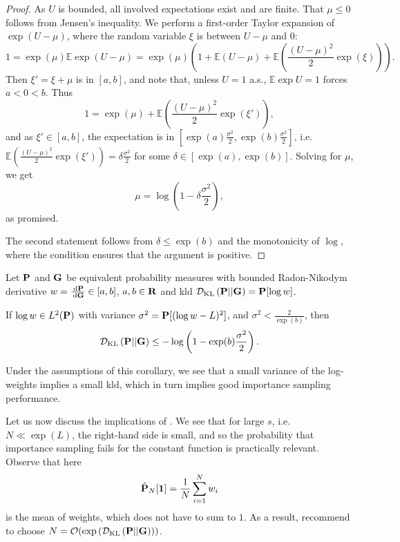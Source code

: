 \begin{proof}
    As $U$ is bounded, all involved expectations exist and are finite. That $\mu \leq 0$ follows from Jensen's inequality. We perform a first-order Taylor expansion of $\exp(U - \mu)$, where the random variable $\xi$ is between $U - \mu$ and $0$:
    $$
    1 = \exp(\mu)\mathbb E \exp (U - \mu) = \exp (\mu) \left( 1 + \mathbb E (U - \mu) + \mathbb E\left(\frac{(U-\mu)^{2}}{2} \exp(\xi)\right) \right).
    $$
    Then $\xi' = \xi + \mu$ is in $[a,b]$, and note that, unless $U = 1$ a.s., $\mathbb E \exp U = 1$ forces $a < 0 < b$. 
    Thus
    $$
    1 = \exp(\mu) + \mathbb E\left(\frac{(U-\mu)^{2}}{2} \exp(\xi')\right),
    $$
    and as $\xi' \in [a,b]$, the expectation is in $\left[\exp(a) \frac{\sigma^{2}}{2}, \exp(b) \frac{\sigma^{2}}{2}\right]$, i.e. $\mathbb E\left(\frac{(U-\mu)^{2}}{2} \exp(\xi')\right) = \delta \frac{\sigma^{2}}{2}$ for some $\delta \in [\exp(a),\exp(b)]$. Solving for $\mu$, we get 
    $$
    \mu = \log \left( 1 - \delta \frac{\sigma^{2}}{2} \right),
    $$
    as promised.

    The second statement follows from $\delta \leq \exp(b)$ and the monotonicity of $\log$, where the condition ensures that the argument is positive.
\end{proof}

\begin{corollary}
    Let $\P$ and $\G$ be equivalent probability measures with bounded Radon-Nikodym derivative $w = \frac{\d\P}{\d\G} \in [a,b]$, $a, b \in \R$ and \acrshort{kld} $\Dkl{\P}{\G} =\P [\log w]$.
    
    If $\log w \in L^{2}(\P)$ with variance $\sigma^{2} = \P [(\log w - L)^2]$, and $\sigma^{2} < \frac{2}{\exp(b)}$, then 
    $$
    \Dkl{\P}{\G} \leq - \log \left(1 - \exp(b) \frac{\sigma^{2}}{2} \right).
    $$
\end{corollary}
Under the assumptions of this corollary, we see that a small variance of the log-weights implies a small \acrshort{kld}, which in turn implies good importance sampling performance.

Let us now discuss the implications of . We see that for large $s$, i.e. $N \ll \exp(L)$, the right-hand side is small, and so the probability that importance sampling fails for the constant function is practically relevant. Observe that here 
$$
\hat \P_{N} [\mathbf 1 ] = \frac{1}{N} \sum_{i = 1}^N w_{i}
$$
is the mean of weights, which does not have to sum to $1$. 
As a result, \citeauthor{Chatterjee2018Sample} recommend to choose $N = \mathcal O( \exp \left( \Dkl{\P}{\G} \right))$. 

